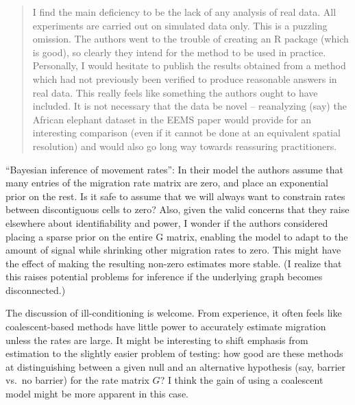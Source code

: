 \begin{quote}
    I find the main deficiency to be the lack of any analysis of real data. All
    experiments are carried out on simulated data only. This is a puzzling omission.
    The authors went to the trouble of creating an R package (which is good), so
    clearly they intend for the method to be used in practice. Personally, I would
    hesitate to publish the results obtained from a method which had not previously
    been verified to produce reasonable answers in real data. This really feels like
    something the authors ought to have included. It is not necessary that the data
    be novel -- reanalyzing (say) the African elephant dataset in the EEMS paper
    would provide for an interesting comparison (even if it cannot be done at an
    equivalent spatial resolution) and would also go long way towards reassuring
    practitioners.
\end{quote}


\begin{point}{}
    ``Bayesian inference of movement rates'': In their model the authors assume
    that many entries of the migration rate matrix are zero, and place an
    exponential prior on the rest. Is it safe to assume that we will always
    want to constrain rates between discontiguous cells to zero? Also, given
    the valid concerns that they raise elsewhere about identifiability and
    power, I wonder if the authors considered placing a sparse prior on the
    entire G matrix, enabling the model to adapt to the amount of signal while
    shrinking other migration rates to zero. This might have the effect of
    making the resulting non-zero estimates more stable. (I realize that this
    raises potential problems for inference if the underlying graph becomes
    disconnected.)
\end{point}


\begin{point}{}
    The discussion of ill-conditioning is welcome. From experience, it often
    feels like coalescent-based methods have little power to accurately
    estimate migration unless the rates are large. It might be interesting to
    shift emphasis from estimation to the slightly easier problem of testing:
    how good are these methods at distinguishing between a given null and an
    alternative hypothesis (say, barrier vs.\ no barrier) for the rate matrix $G$?
    I think the gain of using a coalescent model might be more apparent in this case.
\end{point}

